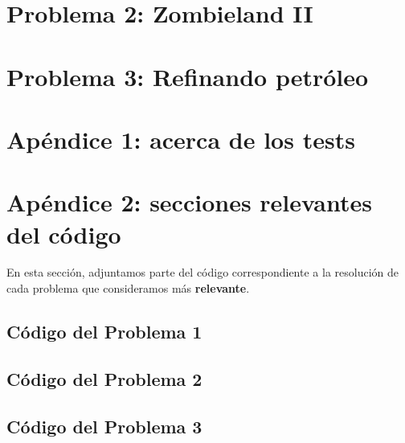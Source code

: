 \documentclass[a4paper]{article}
\begin{document}
\newpage
\section{Problema 2: Zombieland II}


\newpage
\section{Problema 3: Refinando petróleo}



\newpage
\section{Apéndice 1: acerca de los tests}


\newpage
\section{Apéndice 2: secciones relevantes del código}
En esta sección, adjuntamos parte del código correspondiente a la resolución de cada problema que consideramos más \textbf{relevante}.

\subsection{Código del Problema 1}


\subsection{Código del Problema 2}

\subsection{Código del Problema 3}
\end{document}
